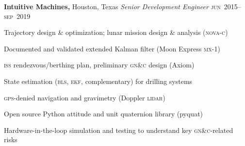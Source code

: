 \documentclass[12pt,letterpaper]{article}
\newenvironment{itemize*}%
{\begin{itemize}%
  \setlength{\itemsep}{0pt}}%
{\end{itemize}}
\newcommand{\rdate}[1]{{\hfill #1}}
\begin{document}
\medskip
\textbf{Intuitive Machines,} Houston, Texas \newline
\emph{Senior Development Engineer} \rdate{\textsc{jun}~2015--\textsc{sep}~2019} %
\begin{itemize*}
  \item Trajectory design \& optimization; lunar mission design \& analysis (\textsc{nova-c})%
  \item Documented and validated extended Kalman filter (Moon Express \textsc{mx}-1)
  \item \textsc{iss} rendezvous/berthing plan, preliminary \textsc{gn\&c} design (Axiom) %
  \item State estimation (\textsc{bls}, \textsc{ekf}, complementary) for drilling systems
  \item \textsc{gps}-denied navigation and gravimetry (Doppler \textsc{lidar})
  \item Open source Python attitude and unit quaternion library (pyquat)
  \item Hardware-in-the-loop simulation and testing to understand key \textsc{gn\&c}-related risks
% 
\end{itemize*}
\end{document}
